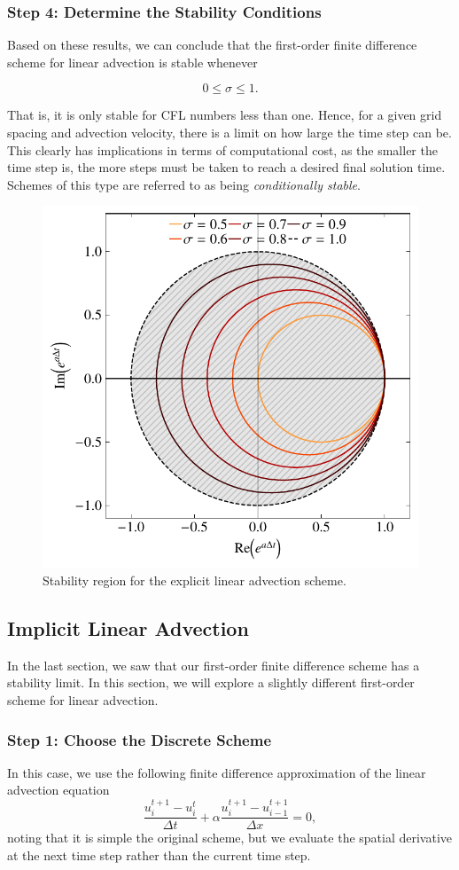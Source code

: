 \subsubsection{Step 4: Determine the Stability Conditions}
Based on these results, we can conclude that the first-order finite difference scheme for linear advection is stable whenever
\begin{eqBox}
\begin{equation}
	0 \leq \sigma \leq 1.
\end{equation}
\end{eqBox}
That is, it is only stable for CFL numbers less than one. Hence, for a given grid spacing and advection velocity, there is a limit on how large the time step can be. This clearly has implications in terms of computational cost, as the smaller the time step is, the more steps must be taken to reach a desired final solution time. Schemes of this type are referred to as being {\it conditionally stable}.


\begin{figure}[htbp]
	\centering
	\includegraphics[width=0.6\linewidth]{Pictures/explicit_advection}
	\caption{Stability region for the explicit linear advection scheme.}
	\label{fig:explicit_advection}
\end{figure}

\subsection{Implicit Linear Advection}
In the last section, we saw that our first-order finite difference scheme has a stability limit. In this section, we will explore a slightly different first-order scheme for linear advection.

\subsubsection{Step 1: Choose the Discrete Scheme}
In this case, we use the following finite difference approximation of the linear advection equation
\begin{equation}
	\frac{u_i^{t+1} - u_{i}^t}{\Delta t} +  \alpha \frac{u_i^{t+1} - u_{i-1}^{t+1}}{\Delta x} = 0,
\end{equation}
noting that it is simple the original scheme, but we evaluate the spatial derivative at the next time step rather than the current time step.

